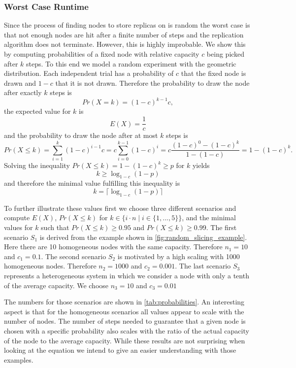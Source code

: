 \subsubsection{Worst Case Runtime}
Since the process of finding nodes to store replicas on is random the worst case is that not enough nodes are hit after a finite number of steps and the replication algorithm does not terminate.
However, this is highly improbable.
We show this by computing probabilities of a fixed node with relative capacity $c$ being picked after $k$ steps.
To this end we model a random experiment with the geometric distribution.
Each independent trial has a probability of $c$ that the fixed node is drawn and $1-c$ that it is not drawn.
Therefore the probability to draw the node after exactly $k$ steps is
\[
	Pr(X=k)=(1-c)^{k-1}c,
\]
the expected value for $k$ is
\[
	E(X)=\frac{1}{c}
\]
and the probability to draw the node after at most $k$ steps is
\[
	Pr(X\leq k)=\sum\limits_{i=1}^{k}(1-c)^{i-1}c=c\sum\limits_{i=0}^{k-1}(1-c)^{i}=c\frac{(1-c)^0-(1-c)^{k}}{1-(1-c)}=1-(1-c)^k.
\]
Solving the inequality $Pr(X\leq k) = 1-(1-c)^k \geq p$ for $k$ yields
\[
	k \geq \log_{1-c}(1 - p)
\]
and therefore the minimal value fulfilling this inequality is
\[
	k=\lceil\log_{1-c}(1 - p)\rceil
\]

To further illustrate these values first we choose three different scenarios and compute $E(X)$, $Pr(X\leq k)$ for $k\in\{i\cdot n\mid i\in\{1,...,5\}\}$, and the minimal values for $k$ such that $Pr(X\leq k)\geq 0.95$ and $Pr(X\leq k)\geq 0.99$.
The first scenario $S_1$ is derived from the example shown in \cref{fig:random_slicing_example}.
Here there are 10 homogeneous nodes with the same capacity.
Therefore $n_1=10$ and $c_1=0.1$.
The second scenario $S_2$ is motivated by a high scaling with 1000 homogeneous nodes.
Therefore $n_2=1000$ and $c_2=0.001$.
The last scenario $S_3$ represents a heterogeneous system in which we consider a node with only a tenth of the average capacity.
We choose $n_3=10$ and $c_3=0.01$

The numbers for those scenarios are shown in \cref{tab:probabilities}.
An interesting aspect is that for the homogeneous scenarios all values appear to scale with the number of nodes.
The number of steps needed to guarantee that a given node is chosen with a specific probability also scales with the ratio of the actual capacity of the node to the average capacity.
While these results are not surprising when looking at the equation we intend to give an easier understanding with those examples.


